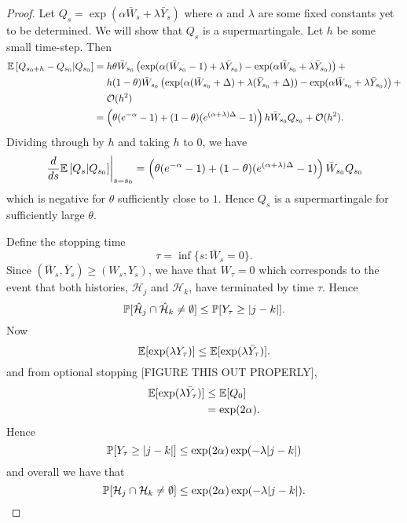\begin{proof}
Let $Q_s = \exp \left(\alpha \bar{W}_s + \lambda \bar{Y}_s \right)$ where $\alpha$ and $\lambda$ are some fixed constants yet to be determined. We will show that $Q_s$ is a supermartingale. Let $h$ be some small time-step. Then
\begin{align}
	\mathbb{E}\left[Q_{s_0 + h} - Q_{s_0}| Q_{s_0}\right] &= h \theta \bar{W}_{s_0} \left(\exp(\alpha (\bar{W}_{s_0} - 1) + \lambda \bar{Y}_{s_0}) - \exp(\alpha \bar{W}_{s_0} + \lambda \bar{Y}_{s_0})\right) + \\
	&\hphantom{= .} h (1 - \theta) \bar{W}_{s_0} \left( \exp(\alpha (\bar{W}_{s_0} + \Delta) + \lambda (\bar{Y}_{s_0} + \Delta)) - \exp(\alpha \bar{W}_{s_0} + \lambda \bar{Y}_{s_0}) \right) + \notag\\
	&\hphantom{= .} \mathcal{O}(h^2) \notag\\
	&= \left(\theta (e^{-\alpha} - 1) + (1 - \theta)(e^{(\alpha + \lambda)\Delta} - 1)\right)h \bar{W}_{s_0} Q_{s_0} + \mathcal{O}(h^2).
\end{align}
Dividing through by $h$ and taking $h$ to $0$, we have
\begin{equation}
	\left.\frac{d}{ds} \mathbb{E}\left[Q_{s} | Q_{s_0}\right] \right|_{s = s_0} = \left(\theta (e^{-\alpha} - 1) + (1 - \theta)(e^{(\alpha + \lambda)\Delta} - 1)\right)\bar{W}_{s_0} Q_{s_0}
\end{equation}
which is negative for $\theta$ sufficiently close to $1$. Hence $Q_s$ is a supermartingale for sufficiently large $\theta$.

Define the stopping time 
\begin{equation}
	\tau = \inf\{s: \bar{W}_s = 0\}.
\end{equation}
Since $(\bar{W}_s, \bar{Y}_s) \geq (W_s, Y_s)$, we have that $W_\tau = 0$ which corresponds to the event that both histories, $\mathcal{H}_j$ and $\mathcal{H}_k$, have terminated by time $\tau$. Hence
\begin{equation}
	\mathbb{P}[\hat{\mathcal{H}}_j \cap \hat{\mathcal{H}}_k \neq \emptyset] \leq \mathbb{P}[Y_\tau \geq |j-k|].
\end{equation}
Now
\begin{equation}
	\mathbb{E}[\exp(\lambda Y_\tau)] \leq \mathbb{E}[\exp(\lambda\bar{Y}_\tau)].
\end{equation}
and from optional stopping [FIGURE THIS OUT PROPERLY],
\begin{align}
	\mathbb{E}[\exp(\lambda \bar{Y}_\tau )] &\leq \mathbb{E}[Q_{0}]\\
	&= \exp(2\alpha).
\end{align}
Hence 
\begin{equation}
	\mathbb{P}[Y_\tau \geq |j-k|] \leq \exp(2\alpha) \exp(-\lambda |j - k|)
\end{equation}
and overall we have that
\begin{equation}
	\mathbb{P}[\mathcal{H}_j \cap \mathcal{H}_k \neq \emptyset] \leq \exp(2\alpha) \exp(-\lambda |j - k|).
\end{equation}
\end{proof}

